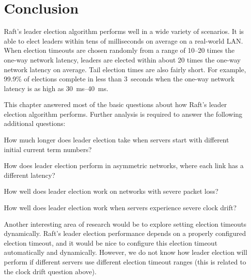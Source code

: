\section{Conclusion}
\label{leaderelection:conclusion}

Raft's leader election algorithm performs well in a wide variety of
scenarios. It is able to elect leaders within tens of milliseconds on
average on a real-world LAN. When election timeouts are chosen randomly
from a range of 10--20 times the one-way network latency, leaders are
elected within about 20 times the one-way network latency on average.
Tail election times are also fairly short. For example, 99.9\% of
elections complete in less than \SI{3}{seconds} when the one-way network
latency is as high as \SIrange{30}{40}{\milli\second}.

This chapter answered most of the basic questions about how Raft's
leader election algorithm performs. Further analysis is required to
answer the following additional questions:
%
\begin{compactitem}
%
\item How much longer does leader election take when servers start with
different initial current term numbers?
%
\item How does leader election perform in asymmetric networks, where
each link has a different latency?
%
\item How well does leader election work on networks with severe packet
loss?
%
\item How well does leader election work when servers experience
severe clock drift?
%
\end{compactitem}

Another interesting area of research would be to explore setting
election timeouts dynamically. Raft's leader election performance
depends on a properly configured election timeout, and it would be nice
to configure this election timeout automatically and dynamically.
However, we do not know how leader election will perform if different
servers use different election timeout ranges (this is related to the
clock drift question above).
